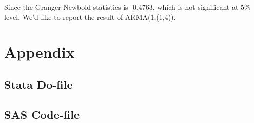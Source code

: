 \documentclass{article}
\begin{document}
Since the Granger-Newbold statistics is -0.4763, which is not significant at 5\% level. We'd like to report the result of ARMA(1,(1,4)).

 \newpage
 \begin{appendix}\label{sec:appendix}
 \section{Appendix}
 \subsection{Stata Do-file}
  
 \newpage
 \subsection{SAS Code-file}
  
% 
% 
% 
 \end{appendix}
\end{document}
